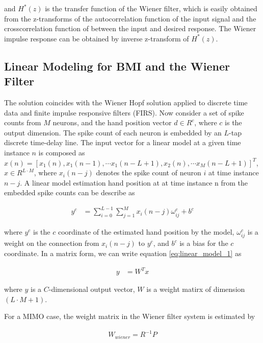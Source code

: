 \documentclass[8pt,a4paper]{article}
\begin{document}
\begin{multicols}{2}
and $H^{*}(z)$ is the transfer function of the Wiener filter, which is easily obtained from the z-transforms of the autocorrelation function of the input signal and the crosscorrelation function of between the input and desired response. 
The Wiener impulse response can be obtained by inverse z-transform of $H^{*}(z)$.

\subsection*{Linear Modeling for BMI and the Wiener Filter}
The solution coincides with the Wiener Hopf solution applied to discrete time data and finite impulse responsive filters (FIRS)\cite{sanchez2007}. 
Now consider a set of spike counts from $M$ neurons, and the hand position vector $d \in R^c $, where $c$ is the output dimension. 
The spike count of each neuron is embedded by an $L$-tap discrete time-delay line. 
The input vector for a linear model at a given time instance $n$ is composed as $x(n)=\left[ x_{1}(n), x_{1}(n-1), \cdots x_{1}(n-L+1), x_{2}(n), \cdots x_{M}(n-L+1) \right]^T $, 
$x\in R^{L \cdot M}$, where $x_{i}(n-j)$ denotes the spike count of neuron $i$ at time instance $n-j$. A linear model estimation hand position at at time instance n from the embedded spike counts can be describe as

\begin{align}
  \label{eq:linear_model_1}
  y^{c} &= \sum_{i=0}^{L-1} \sum_{j=1}^{M} x_{i}(n-j) \omega_{ij}^{c}+b^{c}
\end{align}

where $y^{c}$ is the $c$ coordinate of the estimated hand position by the model, $\omega_{ij}^{c}$ is a weight on the connection from $x_{i}(n-j)$ to $y^{c}$, 
and $b^{c}$ is a bias for the $c$ coordinate. In a matrix form, we can write equation \ref{eq:linear_model_1} as 

\begin{align}
  y&=W^{T} x
\end{align}

where $y$ is a $C$-dimensional output vector, $W$ is a weight matirx of dimension $(L \cdot M +1 )$.

For a MIMO case, the weight matrix in the Wiener filter system is estimated by 

\begin{align}
  W_{wiener}=R^{-1} P 
\end{align}


\end{multicols}
\end{document}
